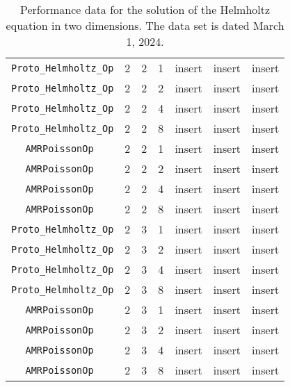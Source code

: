\documentclass{article}
\begin{document}
\begin{small}
\begin{table}
\begin{center}
\begin{tabular}{|c|c|c|c|c|c||c|}
 {\tt Proto\_Helmholtz\_Op} & 2 & 2   & 1    &  insert  &  insert    & insert    \\
 {\tt Proto\_Helmholtz\_Op} & 2 & 2   & 2    &  insert  &  insert    & insert    \\
 {\tt Proto\_Helmholtz\_Op} & 2 & 2   & 4    &  insert  &  insert    & insert    \\
 {\tt Proto\_Helmholtz\_Op} & 2 & 2   & 8    &  insert  &  insert    & insert    \\
\hline                                                                                
 {\tt AMRPoissonOp        } & 2 & 2   & 1    &  insert  &  insert    & insert   \\
 {\tt AMRPoissonOp        } & 2 & 2   & 2    &  insert  &  insert    & insert   \\
 {\tt AMRPoissonOp        } & 2 & 2   & 4    &  insert  &  insert    & insert   \\
 {\tt AMRPoissonOp        } & 2 & 2   & 8    &  insert  &  insert    & insert   \\
 \hline                                                                               
 {\tt Proto\_Helmholtz\_Op} & 2 & 3   & 1    &  insert  &  insert    & insert    \\
 {\tt Proto\_Helmholtz\_Op} & 2 & 3   & 2    &  insert  &  insert    & insert    \\
 {\tt Proto\_Helmholtz\_Op} & 2 & 3   & 4    &  insert  &  insert    & insert    \\
 {\tt Proto\_Helmholtz\_Op} & 2 & 3   & 8    &  insert  &  insert    & insert    \\
\hline                                                                                
 {\tt AMRPoissonOp        } & 2 & 3   & 1    &  insert  &  insert    & insert   \\
 {\tt AMRPoissonOp        } & 2 & 3   & 2    &  insert  &  insert    & insert   \\
 {\tt AMRPoissonOp        } & 2 & 3   & 4    &  insert  &  insert    & insert   \\
 {\tt AMRPoissonOp        } & 2 & 3   & 8    &  insert  &  insert    & insert   \\
 \hline
\end{tabular}
\end{center}
\label{tab::helmholtz_2d}
\caption
    {
      Performance data for the solution of the Helmholtz
      equation in two dimensions.
      The data set is dated March 1, 2024.
    }
\end{table}
\end{small}
\end{document}

